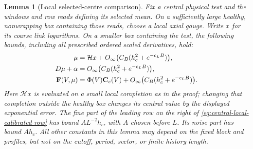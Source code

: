 \documentclass[11pt,reqno]{amsart}
\numberwithin{equation}{section}
\newtheorem{lemma}[theorem]{Lemma}
\theoremstyle{definition}
\theoremstyle{remark}
\begin{document}
\begin{lemma}[Local selected-centre comparison]
\label{lem:central-local-centre}
Fix a central physical test and the windows and row reads defining
its selected mean. On a sufficiently large healthy, nonwrapping
box containing those reads, choose a local axial gauge. Write
\(x\) for its coarse link logarithms. On a smaller box containing
the test, the following bounds, including all prescribed ordered
scaled derivatives, hold:
\begin{align}
 \mu&=\mathcal Hx+O_\infty\bigl(C_B(h_c^2+e^{-c_LB})\bigr),
                                                       \notag\\
 D\mu+\alpha
       &=O_\infty\bigl(C_B(h_c^2+e^{-c_LB})\bigr),
 \label{eq:central-local-mean-jet}\\
 \mathbf F(V,\mu)
       &=\Phi(V)\mathbf C_c(V)
                         +O_\infty\bigl(C_B(h_c^2+e^{-c_LB})\bigr).
 \label{eq:central-local-calibrated-row}
\end{align}
Here \(\mathcal Hx\) is evaluated on a small local completion
as in the proof; changing that completion outside the healthy
box changes its central value by the displayed exponential error.
The fine part of the leading row on the right of
\eqref{eq:central-local-calibrated-row} has bound
\(A L^{-2}h_c\), with \(A\) chosen before \(L\). Its noise
part has bound \(Ah_c\). All other constants in this lemma may
depend on the fixed block and profiles, but not on the cutoff,
period, sector, or finite history length.
\end{lemma}
\end{document}
